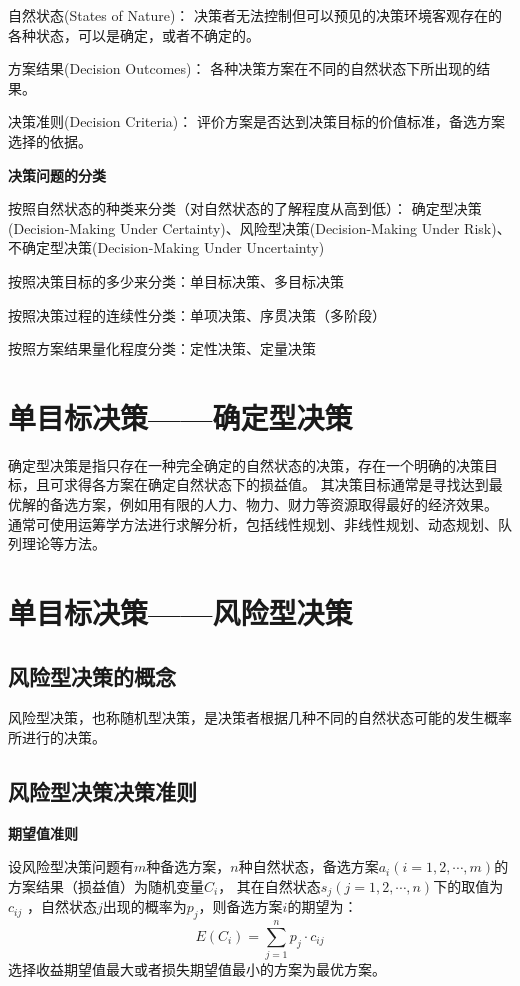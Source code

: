 \documentclass[a4paper,12pt]{article}
\begin{document}
自然状态(States of Nature)：
决策者无法控制但可以预见的决策环境客观存在的各种状态，可以是确定，或者不确定的。

方案结果(Decision Outcomes)：
各种决策方案在不同的自然状态下所出现的结果。

决策准则(Decision Criteria)：
评价方案是否达到决策目标的价值标准，备选方案选择的依据。

\noindent
\textbf{决策问题的分类}

按照自然状态的种类来分类（对自然状态的了解程度从高到低）：
确定型决策(Decision-Making Under Certainty)、风险型决策(Decision-Making Under Risk)、
不确定型决策(Decision-Making Under Uncertainty)
  
按照决策目标的多少来分类：单目标决策、多目标决策
  
按照决策过程的连续性分类：单项决策、序贯决策（多阶段）
  
按照方案结果量化程度分类：定性决策、定量决策
  

\section{单目标决策——确定型决策}

确定型决策是指只存在一种完全确定的自然状态的决策，存在一个明确的决策目标，且可求得各方案在确定自然状态下的损益值。
其决策目标通常是寻找达到最优解的备选方案，例如用有限的人力、物力、财力等资源取得最好的经济效果。
通常可使用运筹学方法进行求解分析，包括线性规划、非线性规划、动态规划、队列理论等方法。

\section{单目标决策——风险型决策}

\subsection{风险型决策的概念}

风险型决策，也称随机型决策，是决策者根据几种不同的自然状态可能的发生概率所进行的决策。

\subsection{风险型决策决策准则}

\noindent
\textbf{期望值准则}
 
设风险型决策问题有$m$种备选方案，$n$种自然状态，备选方案$a_{i}(i=1,2,\cdots,m)$的方案结果（损益值）为随机变量$C_{i}$，
其在自然状态$s_{j}(j=1,2,\cdots,n)$下的取值为$c_{ij}$ ，自然状态$j$出现的概率为$p_{j}$，则备选方案$i$的期望为：
$$
E(C_{i})=\sum_{j=1}^{n}p_{j}\cdot c_{ij}
$$
选择收益期望值最大或者损失期望值最小的方案为最优方案。
\end{document}
